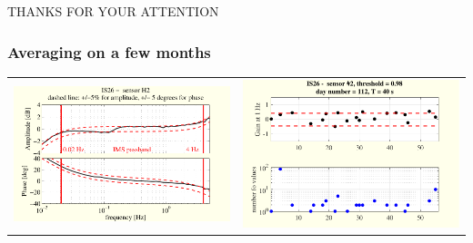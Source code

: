 \documentclass[handout,9pt]{beamer}
\begin{document}
 \begin{frame}
\begin{center}
{\large THANKS FOR YOUR ATTENTION}
\end{center}
\end{frame}




 \begin{frame}
\frametitle{Averaging on a few months}
\begin{tabular}{c||c}
\includegraphics[scale=0.35]{3monthsonIS26SUTboxplot2.pdf}
&
\includegraphics[scale=0.35]{evolutionon2atfreq1bis.pdf}
\end{tabular}
\end{frame}
\end{document}
